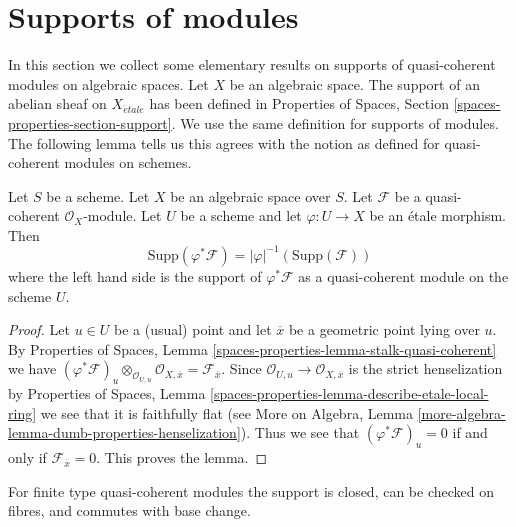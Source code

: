 \section{Supports of modules}
\label{section-support}

\noindent
In this section we collect some elementary results on supports of
quasi-coherent modules on algebraic spaces. Let $X$ be an algebraic
space. The support of an abelian sheaf on $X_{\acute{e}tale}$
has been defined in Properties of Spaces, Section
\ref{spaces-properties-section-support}.
We use the same definition for supports of modules.
The following lemma tells us this agrees with the notion
as defined for quasi-coherent modules on schemes.

\begin{lemma}
\label{lemma-support-covering}
Let $S$ be a scheme. Let $X$ be an algebraic space over $S$.
Let $\mathcal{F}$ be a quasi-coherent $\mathcal{O}_X$-module.
Let $U$ be a scheme and let $\varphi : U \to X$ be an \'etale morphism.
Then
$$
\text{Supp}(\varphi^*\mathcal{F}) = |\varphi|^{-1}(\text{Supp}(\mathcal{F}))
$$
where the left hand side is the support of $\varphi^*\mathcal{F}$ as a
quasi-coherent module on the scheme $U$.
\end{lemma}

\begin{proof}
Let $u\in U$ be a (usual) point and let $\overline{x}$ be a
geometric point lying over $u$. By
Properties of Spaces, Lemma \ref{spaces-properties-lemma-stalk-quasi-coherent}
we have
$(\varphi^*\mathcal{F})_u \otimes_{\mathcal{O}_{U, u}}
\mathcal{O}_{X, \overline{x}} = \mathcal{F}_{\overline{x}}$.
Since $\mathcal{O}_{U, u} \to \mathcal{O}_{X, \overline{x}}$
is the strict henselization by
Properties of Spaces, Lemma
\ref{spaces-properties-lemma-describe-etale-local-ring}
we see that it is faithfully flat (see
More on Algebra, Lemma
\ref{more-algebra-lemma-dumb-properties-henselization}).
Thus we see that $(\varphi^*\mathcal{F})_u = 0$ if and only if
$\mathcal{F}_{\overline{x}} = 0$. This proves the lemma.
\end{proof}

\noindent
For finite type quasi-coherent modules the support is closed,
can be checked on fibres, and commutes with base change.

